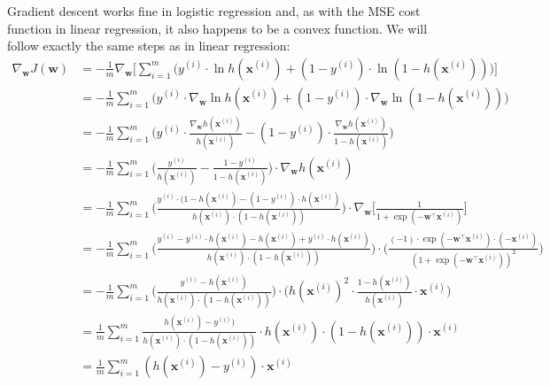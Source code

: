 Gradient descent works fine in logistic regression and, as with the MSE cost function in linear regression, it also
happens to be a convex function. We will follow exactly the same steps as in linear regression:
\begingroup
\allowdisplaybreaks
{\setlength{\jot}{10pt}
\begin{align*}
\nabla_{\boldsymbol{w}} J(\boldsymbol{w})
&= - \frac{1}{m} \nabla_{\boldsymbol{w}} \Big[\sum_{i=1}^{m} \Big( y^{(i)} \cdot \ln h(\boldsymbol{x}^{(i)})
+ (1 - {y^{(i)}}) \cdot \ln (1 - h(\boldsymbol{x}^{(i)}))\Big) \Big] \\
&= - \frac{1}{m} \sum_{i=1}^{m} \Big( y^{(i)} \cdot \nabla_{\boldsymbol{w}} \ln h(\boldsymbol{x}^{(i)})
+ (1 - {y^{(i)}}) \cdot \nabla_{\boldsymbol{w}} \ln (1 - h(\boldsymbol{x}^{(i)})) \Big) \\
&= - \frac{1}{m} \sum_{i=1}^{m} \Big( y^{(i)} \cdot \frac{\nabla_{\boldsymbol{w}}
h(\boldsymbol{x}^{(i)})}{h(\boldsymbol{x}^{(i)})} - (1 - {y^{(i)}}) \cdot \frac{\nabla_{\boldsymbol{w}}
h(\boldsymbol{x}^{(i)})}{1 - h(\boldsymbol{x}^{(i)})} \Big)\\
&= - \frac{1}{m} \sum_{i=1}^{m} \Big( \frac{y^{(i)}}{h(\boldsymbol{x}^{(i)})}
- \frac{1 - {y^{(i)}}}{1 - h(\boldsymbol{x}^{(i)})} \Big) \cdot \nabla_{\boldsymbol{w}} h(\boldsymbol{x}^{(i)}) \\
&= - \frac{1}{m} \sum_{i=1}^{m} \Big( \frac{y^{(i)} \cdot (1 - h(\boldsymbol{x}^{(i)}) - (1 - {y^{(i)}})
\cdot h(\boldsymbol{x}^{(i)})}{h(\boldsymbol{x}^{(i)}) \cdot (1- h(\boldsymbol{x}^{(i)}))} \Big)
\cdot \nabla_{\boldsymbol{w}} \Big[ \frac{1}{1 + \exp(- \boldsymbol{w}^{\intercal} \boldsymbol{x}^{(i)})} \Big] \\
&= - \frac{1}{m} \sum_{i=1}^{m} \Big( \frac{y^{(i)} - y^{(i)} \cdot h(\boldsymbol{x}^{(i)})
- h(\boldsymbol{x}^{(i)}) + {y^{(i)}} \cdot h(\boldsymbol{x}^{(i)})}{h(\boldsymbol{x}^{(i)})
\cdot (1 - h(\boldsymbol{x}^{(i)}))} \Big) \cdot \Big( \frac{(-1)
\cdot \exp(- \boldsymbol{w}^{\intercal} \boldsymbol{x}^{(i)})
\cdot (-\boldsymbol{x}^{(i)})}{(1 + \exp(-\boldsymbol{w}^{\intercal} \boldsymbol{x}^{(i)}))^2} \Big) \\
&= - \frac{1}{m} \sum_{i=1}^{m} \Big( \frac{y^{(i)} - h(\boldsymbol{x}^{(i)})}{h(\boldsymbol{x}^{(i)})
\cdot (1 - h(\boldsymbol{x}^{(i)}))} \Big) \cdot \Big( h(\boldsymbol{x}^{(i)})^2
\cdot \frac{1 - h(\boldsymbol{x}^{(i)})}{h(\boldsymbol{x}^{(i)})} \cdot \boldsymbol{x}^{(i)} \Big) \\
&= \frac{1}{m} \sum_{i=1}^{m} \frac{h(\boldsymbol{x}^{(i)}) - y^{(i)})}{h(\boldsymbol{x}^{(i)})
\cdot (1 - h (\boldsymbol{x}^{(i)}))} \cdot h(\boldsymbol{x}^{(i)})
\cdot (1- h(\boldsymbol{x}^{(i)}))\cdot\boldsymbol{x}^{(i)} \\
&= \frac{1}{m} \sum_{i=1}^{m} (h(\boldsymbol{x}^{(i)}) - y^{(i)}) \cdot \boldsymbol{x}^{(i)}
\end{align*}}
\endgroup


